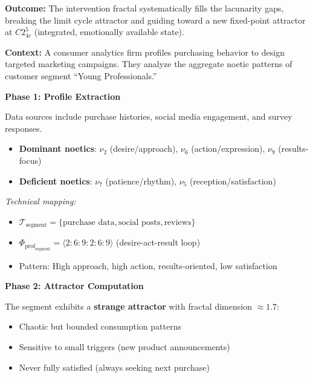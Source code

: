 \documentclass[11pt,twoside]{book}
\newcommand{\noe}[1]{\nu_{#1}}
\newcommand{\ProfileFrac}{\Phi_{\mathrm{prof}}}
\newcommand{\TextCorpus}{\mathcal{T}}
\begin{document}
\begin{tcolorbox}[colback=yellow!5!white,colframe=yellow!65!black,title=\textbf{Scenario 1: Therapeutic Application --- Trauma Patient},breakable]
\textbf{Outcome:}
The intervention fractal systematically fills the lacunarity gaps, breaking the limit cycle
attractor and guiding toward a new fixed-point attractor at $C2^5_{4c}$ (integrated,
emotionally available state).

\end{tcolorbox}

\begin{tcolorbox}[colback=yellow!5!white,colframe=yellow!65!black,title=\textbf{Scenario 2: Marketing Application --- Consumer Behavior Modeling},breakable]

\textbf{Context:}
A consumer analytics firm profiles purchasing behavior to design targeted marketing
campaigns. They analyze the aggregate noetic patterns of customer segment ``Young Professionals.''

\textbf{Phase 1: Profile Extraction}

Data sources include purchase histories, social media engagement, and survey responses.
\begin{itemize}
    \item \textbf{Dominant noetics}: $\noe{2}$ (desire/approach), $\noe{6}$ (action/expression),
          $\noe{9}$ (results-focus)
    \item \textbf{Deficient noetics}: $\noe{7}$ (patience/rhythm), $\noe{5}$ (reception/satisfaction)
\end{itemize}

\textit{Technical mapping:}
\begin{itemize}
    \item $\TextCorpus_{\mathrm{segment}} = \{\text{purchase data}, \text{social posts}, \text{reviews}\}$
    \item $\ProfileFrac_{\mathrm{segment}} = \langle 2:6:9:2:6:9 \rangle$ (desire-act-result loop)
    \item Pattern: High approach, high action, results-oriented, low satisfaction
\end{itemize}

\textbf{Phase 2: Attractor Computation}

The segment exhibits a \textbf{strange attractor} with fractal dimension $\approx 1.7$:
\begin{itemize}
    \item Chaotic but bounded consumption patterns
    \item Sensitive to small triggers (new product announcements)
    \item Never fully satisfied (always seeking next purchase)
\end{itemize}


\end{tcolorbox}
\end{document}
